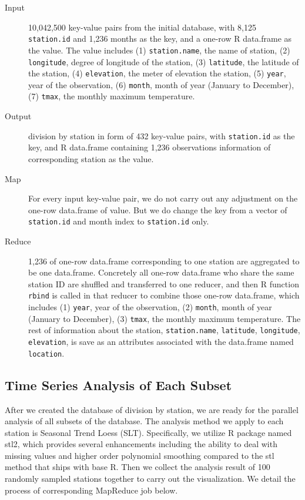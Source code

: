 \begin{description}
  \item[Input] 10,042,500 key-value pairs from the initial database, with 8,125 
  \texttt{station.id} and 1,236 months as the key, and a one-row R data.frame 
  as the value. The value includes (1) \texttt{station.name}, the name of station, 
  (2) \texttt{longitude}, degree of longitude of the station, (3) \texttt{latitude}, 
  the latitude of the station, (4) \texttt{elevation}, the meter of elevation the 
  station, (5) \texttt{year}, year of the observation, (6) \texttt{month}, month 
  of year (January to December), (7) \texttt{tmax}, the monthly maximum temperature.
  \item[Output] division by station in form of 432 key-value pairs, with 
  \texttt{station.id} as the key, and R data.frame containing 1,236 observations
  information of corresponding station as the value.
  \item[Map]For every input key-value pair, we do not carry out any adjustment on
  the one-row data.frame of value. But we do change the key from a vector of 
  \texttt{station.id} and month index to \texttt{station.id} only. 
  \item[Reduce] 1,236 of one-row data.frame corresponding to one station are 
  aggregated to be one data.frame. Concretely all one-row data.frame who share
  the same station ID are shuffled and transferred to one reducer, and then R function 
  \texttt{rbind} is called in that reducer to combine those one-row data.frame, 
  which includes (1) \texttt{year}, year of the observation, (2) \texttt{month}, 
  month of year (January to December), (3) \texttt{tmax}, the monthly maximum 
  temperature. The rest of information about the station, \texttt{station.name}, 
  \texttt{latitude}, \texttt{longitude}, \texttt{elevation}, is save as an 
  attributes associated with the data.frame named \texttt{location}.
\end{description}

\subsection{Time Series Analysis of Each Subset}

After we created the database of division by station, we are ready for the parallel 
analysis of all subsets of the database. The analysis method we apply to each station
is Seasonal Trend Loess (SLT). Specifically, we utilize R package named stl2\cite{stl2},
which provides several enhancements including the ability to deal with missing values 
and higher order polynomial smoothing compared to the stl method that ships with 
base R. Then we collect the analysis result of 100 randomly sampled stations together 
to carry out the visualization. We detail the process of corresponding MapReduce 
job below.

